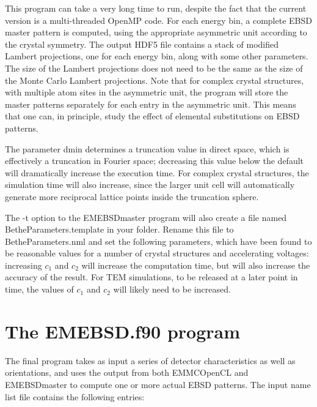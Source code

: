 \documentclass[DIV=calc, paper=letter, fontsize=11pt]{scrartcl}	 %
\begin{document}
This program can take a very long time to run, despite the fact that the current version is a multi-threaded OpenMP code.
For each energy bin, a complete EBSD master pattern is computed, using the appropriate asymmetric unit according to
the crystal symmetry.  The output HDF5 file contains a stack of modified Lambert projections, one for each energy bin, along with 
some other parameters.  The size of the Lambert projections does not need to be the same as the size of the Monte Carlo
Lambert projections.  %
Note that for complex crystal structures,
with multiple atom sites in the asymmetric unit, the program will store the master patterns separately for each entry in the asymmetric unit.
This means that one can, in principle, study the effect of elemental substitutions on EBSD patterns.

The parameter \textsf{dmin} determines a truncation value in direct space, which is effectively a truncation in Fourier space; decreasing
this value below the default will dramatically increase the execution time.  For complex crystal structures, the simulation time will also
increase, since the larger unit cell will automatically generate more reciprocal lattice points inside the truncation sphere.


The \textsf{-t} option to the \textsf{EMEBSDmaster} program will also create a file named \textsf{BetheParameters.template} in
your folder.  Rename this file to \textsf{BetheParameters.nml} and set the following parameters, which have been found to be 
reasonable values for a number of crystal structures and accelerating voltages:
increasing $c_1$ and $c_2$ will increase the computation time, but will also increase the accuracy of the result. For TEM simulations,
to be released at a later point in time, the values of $c_1$ and $c_2$ will likely need to be increased.

\section{The \protect\textsf{EMEBSD.f90} program\label{sec:f90EBSD}}
The final program takes as input a series of detector characteristics as well as orientations, and uses the output from both \textsf{EMMCOpenCL} and
\textsf{EMEBSDmaster} to compute one or more actual EBSD patterns.  
The input name list file contains the following entries:
\end{document}
